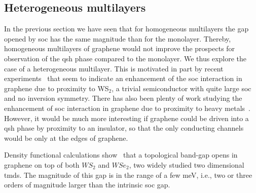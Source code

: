 \subsection{Heterogeneous multilayers}
\label{Heterogeneous}
In the previous section we have seen that for homogeneous multilayers the gap opened by \ac{soc} has the same magnitude than for the monolayer. Thereby, homogeneous multilayers of graphene  would not improve the prospects for observation of the \ac{qsh} phase compared to the monolayer. We thus explore the case of a heterogeneous multilayer. This is motivated in part by recent experiments~\cite{Avsar2014} that seem to indicate an enhancement of the \ac{soc} interaction in graphene due to proximity to WS$_2$, a trivial semiconductor with quite large \ac{soc} and no inversion symmetry. There has also been plenty of work studying the enhancement of \ac{soc} interaction in graphene due to proximity to heavy metals~\cite{Zhang2014a}. However, it would be much more interesting if graphene could be driven into a \ac{qsh} phase by proximity to an insulator, so that the only conducting channels would be only at the edges of graphene.

Density functional calculations show~\cite{Kaloni2014} that a topological band-gap opens in graphene on top of both $WS_2$ and $WSe_2$, two widely studied two dimensional \acp{tmd}.  The magnitude of this gap is in the range of a few meV, i.e.,  two or  three orders of magnitude larger than  the intrinsic \ac{soc} gap.

